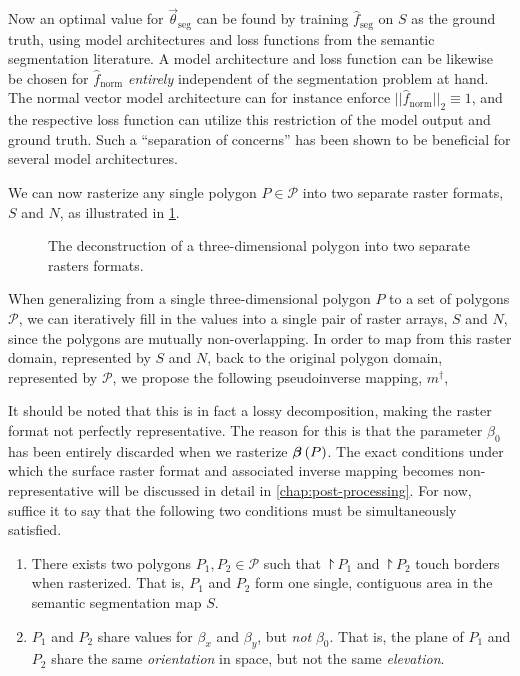 Now an optimal value for $\vec{\theta}_{\mathrm{seg}}$ can be found by training $\hat{f}_{\mathrm{seg}}$ on $S$ as the ground truth, using model architectures and loss functions from the semantic segmentation literature.
A model architecture and loss function can be likewise be chosen for $\hat{f}_{\mathrm{norm}}$ \emph{entirely} independent of the segmentation problem at hand.
The normal vector model architecture can for instance enforce $||\hat{f}_{\mathrm{norm}}||_2 \equiv 1$, and the respective loss function can utilize this restriction of the model output and ground truth.
Such a \enquote{separation of concerns} has been shown to be beneficial for several model architectures.

We can now rasterize any single polygon $P \in \mathcal{P}$ into two separate raster formats, $S$ and $N$, as illustrated in \cref{fig:3d-polygon-decomposition}.
\begin{figure}
  \centering
  \caption{The deconstruction of a three-dimensional polygon into two separate rasters formats.}%
  \label{fig:3d-polygon-decomposition}
\end{figure}
When generalizing from a single three-dimensional polygon $P$ to a set of polygons $\mathcal{P}$, we can iteratively fill in the values into a single pair of raster arrays, $S$ and $N$, since the polygons are mutually non-overlapping.
In order to map from this raster domain, represented by $S$ and $N$, back to the original polygon domain, represented by $\mathcal{P}$, we propose the following pseudoinverse mapping, $m^{\dagger}$,

\noindent
It should be noted that this is in fact a lossy decomposition, making the raster format not perfectly representative.
The reason for this is that the parameter $\beta_0$ has been entirely discarded when we rasterize $\boldsymbol{\beta}\left(P\right)$.
The exact conditions under which the surface raster format and associated inverse mapping becomes non-representative will be discussed in detail in \cref{chap:post-processing}.
For now, suffice it to say that the following two conditions must be simultaneously satisfied.
\begin{enumerate}
  \item There exists two polygons $P_1, P_2 \in \mathcal{P}$ such that $\project{P_1}$ and $\project{P_2}$ touch borders when rasterized.
    That is, $P_1$ and $P_2$ form one single, contiguous area in the semantic segmentation map $S$.
  \item $P_1$ and $P_2$ share values for $\beta_x$ and $\beta_y$, but \emph{not} $\beta_0$.
    That is, the plane of $P_1$ and $P_2$ share the same \textit{orientation} in space, but not the same \textit{elevation}.
\end{enumerate}
